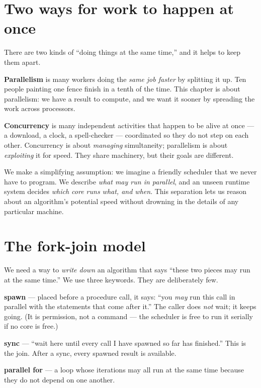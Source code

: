 \section{Two ways for work to happen at once}

There are two kinds of ``doing things at the same time,'' and it helps to
keep them apart.

\begin{intuitionbox}
\textbf{Parallelism} is many workers doing the \emph{same job faster} by
splitting it up. Ten people painting one fence finish in a tenth of the time.
This chapter is about parallelism: we have a result to compute, and we want it
sooner by spreading the work across processors.

\textbf{Concurrency} is many independent activities that happen to be alive at
once --- a download, a clock, a spell-checker --- coordinated so they do not step
on each other. Concurrency is about \emph{managing} simultaneity; parallelism is
about \emph{exploiting} it for speed. They share machinery, but their goals are
different.
\end{intuitionbox}

We make a simplifying assumption: we imagine a friendly scheduler that we never have to program. We describe \emph{what may run in parallel}, and an unseen runtime
system decides \emph{which core runs what, and when}. This separation lets us
reason about an algorithm's potential speed without drowning in the details of
any particular machine.

\section{The fork-join model}

We need a way to \emph{write down} an algorithm that says ``these two pieces may
run at the same time.'' We use three keywords. They are deliberately few.

\begin{focusbox}
\textbf{spawn} --- placed before a procedure call, it says: ``you \emph{may} run
this call in parallel with the statements that come after it.'' The caller does
\emph{not} wait; it keeps going. (It is permission, not a command --- the
scheduler is free to run it serially if no core is free.)

\textbf{sync} --- ``wait here until every call I have spawned so far has
finished.'' This is the join. After a sync, every spawned result is available.

\textbf{parallel for} --- a loop whose iterations may all run at the same time
because they do not depend on one another.
\end{focusbox}

